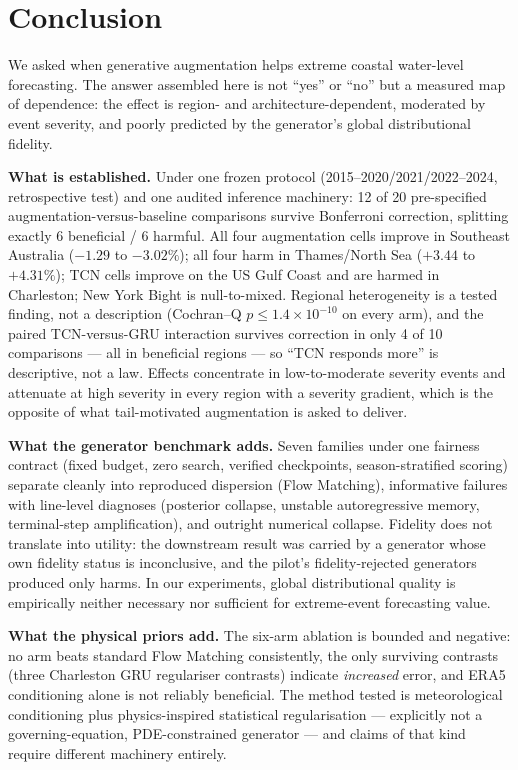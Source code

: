 \section{Conclusion}
\label{sec:conclusion}

We asked when generative augmentation helps extreme coastal water-level
forecasting. The answer assembled here is not ``yes'' or ``no'' but a
measured map of dependence: the effect is region- and architecture-dependent,
moderated by event severity, and poorly predicted by the generator's global
distributional fidelity.

\textbf{What is established.} Under one frozen protocol
(2015--2020/2021/2022--2024, retrospective test) and one audited inference
machinery: 12 of 20 pre-specified augmentation-versus-baseline comparisons
survive Bonferroni correction, splitting exactly 6 beneficial / 6 harmful.
All four augmentation cells improve in Southeast Australia ($-1.29$ to
$-3.02\%$); all four harm in Thames/North Sea ($+3.44$ to $+4.31\%$); TCN
cells improve on the US Gulf Coast and are harmed in Charleston; New York
Bight is null-to-mixed. Regional heterogeneity is a tested finding, not a
description (Cochran--Q $p \le 1.4\times10^{-10}$ on every arm), and the
paired TCN-versus-GRU interaction survives correction in only 4 of 10
comparisons --- all in beneficial regions --- so ``TCN responds more'' is
descriptive, not a law. Effects concentrate in low-to-moderate severity
events and attenuate at high severity in every region with a severity
gradient, which is the opposite of what tail-motivated augmentation is asked
to deliver.

\textbf{What the generator benchmark adds.} Seven families under one
fairness contract (fixed budget, zero search, verified checkpoints,
season-stratified scoring) separate cleanly into reproduced dispersion
(Flow Matching), informative failures with line-level diagnoses
(posterior collapse, unstable autoregressive memory, terminal-step
amplification), and outright numerical collapse. Fidelity does not translate
into utility: the downstream result was carried by a generator whose own
fidelity status is inconclusive, and the pilot's fidelity-rejected
generators produced only harms. In our experiments, global distributional quality is empirically
neither necessary nor sufficient for extreme-event forecasting value.

\textbf{What the physical priors add.} The six-arm ablation is bounded and
negative: no arm beats standard Flow Matching consistently, the only
surviving contrasts (three Charleston GRU regulariser contrasts) indicate
\emph{increased} error, and ERA5 conditioning alone is not reliably
beneficial. The method tested is meteorological conditioning plus
physics-inspired statistical regularisation --- explicitly not a
governing-equation, PDE-constrained generator --- and claims of that kind
require different machinery entirely.

